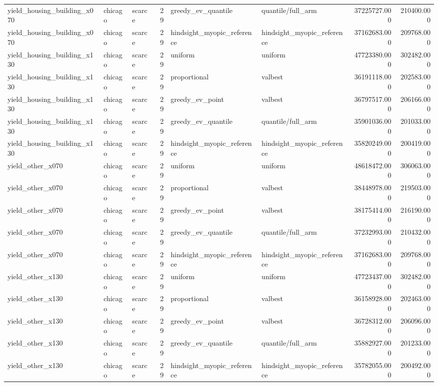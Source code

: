 \begin{tabular}{lllrllrr}
yield\_housing\_building\_x070 & chicago & scarce & 29 & greedy\_ev\_quantile & quantile/full\_arm & 37225727.000 & 210400.000 \\
yield\_housing\_building\_x070 & chicago & scarce & 29 & hindsight\_myopic\_reference & hindsight\_myopic\_reference & 37162683.000 & 209768.000 \\
yield\_housing\_building\_x130 & chicago & scarce & 29 & uniform & uniform & 47723380.000 & 302482.000 \\
yield\_housing\_building\_x130 & chicago & scarce & 29 & proportional & valbest & 36191118.000 & 202583.000 \\
yield\_housing\_building\_x130 & chicago & scarce & 29 & greedy\_ev\_point & valbest & 36797517.000 & 206166.000 \\
yield\_housing\_building\_x130 & chicago & scarce & 29 & greedy\_ev\_quantile & quantile/full\_arm & 35901036.000 & 201033.000 \\
yield\_housing\_building\_x130 & chicago & scarce & 29 & hindsight\_myopic\_reference & hindsight\_myopic\_reference & 35820249.000 & 200419.000 \\
yield\_other\_x070 & chicago & scarce & 29 & uniform & uniform & 48618472.000 & 306063.000 \\
yield\_other\_x070 & chicago & scarce & 29 & proportional & valbest & 38448978.000 & 219503.000 \\
yield\_other\_x070 & chicago & scarce & 29 & greedy\_ev\_point & valbest & 38175414.000 & 216190.000 \\
yield\_other\_x070 & chicago & scarce & 29 & greedy\_ev\_quantile & quantile/full\_arm & 37232993.000 & 210432.000 \\
yield\_other\_x070 & chicago & scarce & 29 & hindsight\_myopic\_reference & hindsight\_myopic\_reference & 37162683.000 & 209768.000 \\
yield\_other\_x130 & chicago & scarce & 29 & uniform & uniform & 47723437.000 & 302482.000 \\
yield\_other\_x130 & chicago & scarce & 29 & proportional & valbest & 36158928.000 & 202463.000 \\
yield\_other\_x130 & chicago & scarce & 29 & greedy\_ev\_point & valbest & 36728312.000 & 206096.000 \\
yield\_other\_x130 & chicago & scarce & 29 & greedy\_ev\_quantile & quantile/full\_arm & 35882927.000 & 201233.000 \\
yield\_other\_x130 & chicago & scarce & 29 & hindsight\_myopic\_reference & hindsight\_myopic\_reference & 35782055.000 & 200492.000 \\

\end{tabular}
